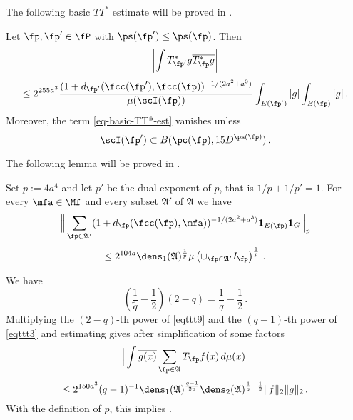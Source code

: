 The following basic $TT^*$ estimate will be proved in .
\begin{lemma}
    \label{tile-correlation}
    Let $\fp, \fp'\in \fP$ with
    $\ps({\fp'})\leq \ps({\fp})$.
    Then
    \begin{equation}
        \label{eq-basic-TT*-est}
        \left|\int T^*_{\fp'}g\overline{T^*_{\fp}g}\right|
    \end{equation}
    \begin{equation}
        \le 2^{255a^3}\frac{(1+d_{\fp'}(\fcc(\fp'), \fcc(\fp))^{-1/(2a^2+a^3)}}{\mu(\scI(\fp))}\int_{E(\fp')}|g|\int_{E(\fp)}|g|\,.
    \end{equation}
    Moreover, the term \eqref{eq-basic-TT*-est} vanishes unless
    \begin{equation}
        \scI(\fp') \subset B(\pc(\fp), 15D^{\ps(\fp)})\, .
    \end{equation}
\end{lemma}

The following lemma will be proved in .
\begin{lemma}
    \label{antichain-tile-count}
    Set $p:=4a^4$ and let $p'$ be the dual exponent of $p$, that is $1/p+1/p'=1$.
    For every $\mfa\in\Mf$ and every subset $\mathfrak{A}'$ of $\mathfrak{A}$ we have
    \begin{equation}
        \label{eq-antichain-Lp}
        \Big\|\sum_{\fp\in\mathfrak{A}'}(1+d_{\fp}(\fcc(\fp), \mfa))^{-1/(2a^2+a^3)}\mathbf{1}_{E(\fp)}\mathbf{1}_G\Big\|_{p}
    \end{equation}
    \begin{equation}
        \le
        2^{104a}\dens_1(\mathfrak{A})^{\frac 1p}\mu\left(\cup_{\fp\in\mathfrak{A}'}I_{\fp}\right)^{\frac 1p}\, .
    \end{equation}
\end{lemma}

We have
\begin{equation}
    \left (\frac 1{\tilde{q}} -\frac 12\right) (2-q)= \frac 1q -\frac 12\,.
\end{equation}
Multiplying the $(2-q)$-th power of \eqref{eqttt9} and the $(q-1)$-th power of \eqref{eqttt3}
and estimating gives after simplification of some factors
\begin{equation}\label{eqttt8}
    \Big|\int \overline{g(x)} \sum_{\fp \in \mathfrak{A}} T_{\fp} f(x)\, d\mu(x)\Big|
\end{equation}
 \begin{equation}
    \le 2^{150a^3}({q}-1)^{-1} \dens_1(\mathfrak{A})^{\frac {q-1}{2p}}\dens_2(\mathfrak{A})^{\frac 1{q}-\frac 12} \|f\|_2\|g\|_2\, .
\end{equation}
With the definition of $p$, this implies
.


